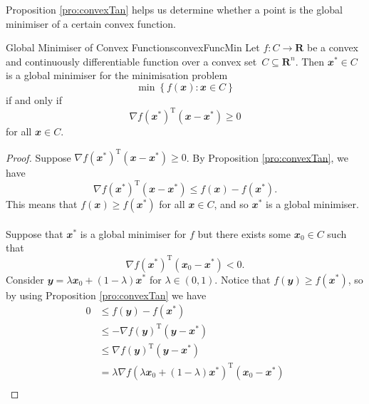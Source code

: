 \documentclass[math]{amznotes}
\theoremstyle{remark}
\begin{document}
Proposition \ref{pro:convexTan} helps us determine whether a point is the global minimiser of a certain convex function.
\begin{thmbox}{Global Minimiser of Convex Functions}{convexFuncMin}
    Let $f \colon C \to \mathbf{R}$ be a convex and continuously differentiable function over a convex set~$C \subseteq \mathbf{R}^n$. Then $\mathbfit{x}^* \in C$ is a global minimiser for the minimisation problem 
    \begin{displaymath}
        \min\left\{f(\mathbfit{x}) \colon \mathbfit{x} \in C\right\}
    \end{displaymath}
    if and only if
    \begin{equation*}
        \nabla f(\mathbfit{x}^*)^{\mathrm{T}}(\mathbfit{x} - \mathbfit{x}^*) \geq 0
    \end{equation*}
    for all $\mathbfit{x} \in C$.
    \tcblower   
    \begin{proof}
        Suppose $\nabla f(\mathbfit{x}^*)^{\mathrm{T}}(\mathbfit{x} - \mathbfit{x}^*) \geq 0$. By Proposition \ref{pro:convexTan}, we have 
        \begin{equation*}
            \nabla f(\mathbfit{x}^*)^{\mathrm{T}}(\mathbfit{x} - \mathbfit{x}^*) \leq f(\mathbfit{x}) - f(\mathbfit{x}^*).
        \end{equation*}
        This means that $f(\mathbfit{x}) \geq f(\mathbfit{x}^*)$ for all $\mathbfit{x} \in C$, and so $\mathbfit{x}^*$ is a global minimiser.
        \\\\
        Suppose that $\mathbfit{x}^*$ is a global minimiser for $f$ but there exists some $\mathbfit{x}_0 \in C$ such that
        \begin{equation*}
            \nabla f(\mathbfit{x}^*)^{\mathrm{T}}(\mathbfit{x}_0 - \mathbfit{x}^*) < 0.
        \end{equation*}
        Consider $\mathbfit{y} = \lambda\mathbfit{x}_0 + (1 - \lambda)\mathbfit{x}^*$ for $\lambda \in (0, 1)$. Notice that $f(\mathbfit{y}) \geq f(\mathbfit{x}^*)$, so by using Proposition \ref{pro:convexTan} we have
        \begin{align*}
            0 & \leq f(\mathbfit{y}) - f(\mathbfit{x}^*) \\
            & \leq -\nabla f(\mathbfit{y})^{\mathrm{T}}(\mathbfit{y - x^*}) \\
            & \leq \nabla f(\mathbfit{y})^{\mathrm{T}}(\mathbfit{y - x^*}) \\
            & = \lambda\nabla f\left(\lambda\mathbfit{x}_0 + (1 - \lambda)\mathbfit{x}^*\right)^{\mathrm{T}}(\mathbfit{x_0 - x^*}) \\

\end{align*}
\end{proof}
\end{thmbox}
\end{document}
